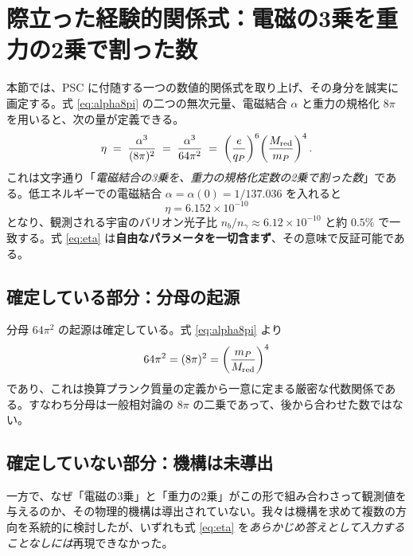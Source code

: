 \documentclass[11pt,a4paper]{article}
\begin{document}
\section{際立った経験的関係式：電磁の3乗を重力の2乗で割った数}
本節では、PSC に付随する一つの数値的関係式を取り上げ、その身分を誠実に画定する。式 \eqref{eq:alpha8pi} の二つの無次元量、電磁結合 $\alpha$ と重力の規格化 $8\pi$ を用いると、次の量が定義できる。
\begin{equation}
\eta \;=\; \frac{\alpha^3}{(8\pi)^2} \;=\; \frac{\alpha^3}{64\pi^2}
\;=\; \left(\frac{e}{q_P}\right)^{6}\!\left(\frac{M_{\rm red}}{m_P}\right)^{4}.
\label{eq:eta}
\end{equation}
これは文字通り「\emph{電磁結合の3乗を、重力の規格化定数の2乗で割った数}」である。低エネルギーでの電磁結合 $\alpha=\alpha(0)=1/137.036$ を入れると
\begin{equation}
\eta = 6.152\times10^{-10}
\end{equation}
となり、観測される宇宙のバリオン光子比 $n_b/n_\gamma \approx 6.12\times10^{-10}$ と約 $0.5\%$ で一致する。式 \eqref{eq:eta} は\textbf{自由なパラメータを一切含まず}、その意味で反証可能である。

\subsection{確定している部分：分母の起源}
分母 $64\pi^2$ の起源は確定している。式 \eqref{eq:alpha8pi} より
\begin{equation}
64\pi^2 = (8\pi)^2 = \left(\frac{m_P}{M_{\rm red}}\right)^{4}
\end{equation}
であり、これは換算プランク質量の定義から一意に定まる厳密な代数関係である。すなわち分母は一般相対論の $8\pi$ の二乗であって、後から合わせた数ではない。

\subsection{確定していない部分：機構は未導出}
一方で、なぜ「電磁の3乗」と「重力の2乗」がこの形で組み合わさって観測値を与えるのか、その物理的機構は導出されていない。我々は機構を求めて複数の方向を系統的に検討したが、いずれも式 \eqref{eq:eta} を\emph{あらかじめ答えとして入力することなしには}再現できなかった。
\end{document}
